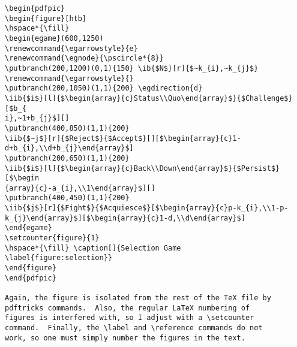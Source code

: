\documentclass[12pt]{article}
\begin{document}
\begin{verbatim}
\begin{pdfpic}
\begin{figure}[htb]
\hspace*{\fill}
\begin{egame}(600,1250)
\renewcommand{\egarrowstyle}{e}
\renewcommand{\egnode}{\pscircle*{8}}
\putbranch(200,1200)(0,1){150} \ib{$N$}[r]{$~k_{i},~k_{j}$}
\renewcommand{\egarrowstyle}{}
\putbranch(200,1050)(1,1){200} \egdirection{d}
\iib{$i$}[l]{$\begin{array}{c}Status\\Quo\end{array}$}{$Challenge$}[$b_{
i},~1+b_{j}$][]
\putbranch(400,850)(1,1){200}
\iib{$~j$}[r]{$Reject$}{$Accept$}[][$\begin{array}{c}1-
d+b_{i},\\d+b_{j}\end{array}$]
\putbranch(200,650)(1,1){200}
\iib{$i$}[l]{$\begin{array}{c}Back\\Down\end{array}$}{$Persist$}[$\begin
{array}{c}-a_{i},\\1\end{array}$][]
\putbranch(400,450)(1,1){200}
\iib{$j$}[r]{$Fight$}{$Acquiesce$}[$\begin{array}{c}p-k_{i},\\1-p-
k_{j}\end{array}$][$\begin{array}{c}1-d,\\d\end{array}$]
\end{egame}
\setcounter{figure}{1}
\hspace*{\fill} \caption[]{Selection Game
\label{figure:selection}}
\end{figure}
\end{pdfpic}

Again, the figure is isolated from the rest of the TeX file by
pdftricks commands.  Also, the regular LaTeX numbering of 
figures is interfered with, so I adjust with a \setcounter 
command.  Finally, the \label and \reference commands do not 
work, so one must simply number the figures in the text.
\end{verbatim}
\end{document}
